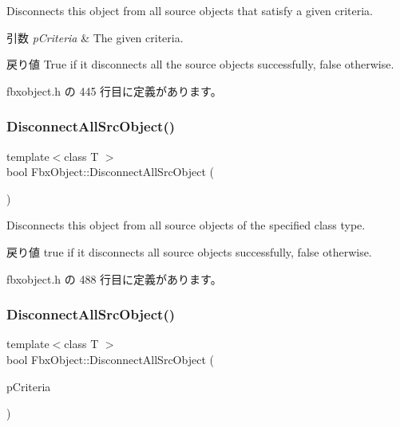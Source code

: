 Disconnects this object from all source objects that satisfy a given criteria. 
\begin{DoxyParams}{引数}
{\em p\+Criteria} & The given criteria. \\
\hline
\end{DoxyParams}
\begin{DoxyReturn}{戻り値}
{\ttfamily True} if it disconnects all the source objects successfully, {\ttfamily false} otherwise. 
\end{DoxyReturn}


 fbxobject.\+h の 445 行目に定義があります。

\mbox{\label{class_fbx_object_a17f59548a86067094c17501801e7aa46}} 
\subsubsection{\texorpdfstring{Disconnect\+All\+Src\+Object()}{DisconnectAllSrcObject()}\hspace{0.1cm}{\footnotesize\ttfamily [3/4]}}
{\footnotesize\ttfamily template$<$class T $>$ \\
bool Fbx\+Object\+::\+Disconnect\+All\+Src\+Object (\begin{DoxyParamCaption}{ }\end{DoxyParamCaption})\hspace{0.3cm}{\ttfamily [inline]}}

Disconnects this object from all source objects of the specified class type. \begin{DoxyReturn}{戻り値}
{\ttfamily true} if it disconnects all source objects successfully, {\ttfamily false} otherwise. 
\end{DoxyReturn}


 fbxobject.\+h の 488 行目に定義があります。

\mbox{\label{class_fbx_object_ae5b578e810b22bcd8d0df323097ed995}} 
\subsubsection{\texorpdfstring{Disconnect\+All\+Src\+Object()}{DisconnectAllSrcObject()}\hspace{0.1cm}{\footnotesize\ttfamily [4/4]}}
{\footnotesize\ttfamily template$<$class T $>$ \\
bool Fbx\+Object\+::\+Disconnect\+All\+Src\+Object (\begin{DoxyParamCaption}\item[{const \hyperlink{class_fbx_criteria}{Fbx\+Criteria} \&}]{p\+Criteria }\end{DoxyParamCaption})\hspace{0.3cm}{\ttfamily [inline]}}

